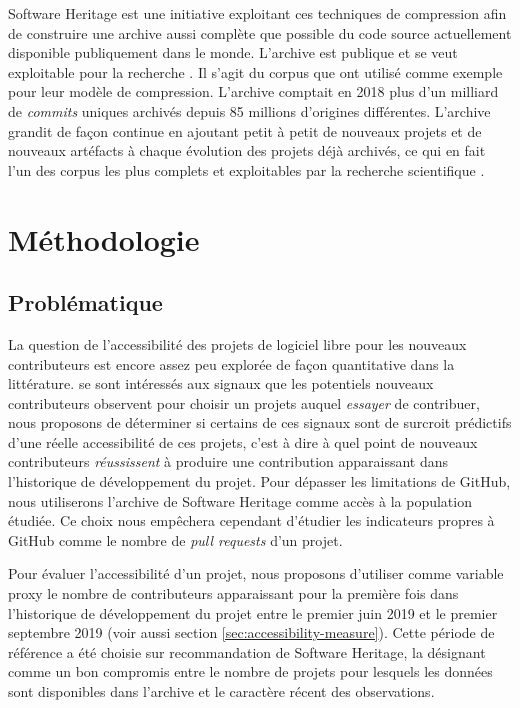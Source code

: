 \documentclass[dvipsnames,runningheads]{llncs}
\newcommand{\en}[1]{\foreignlanguage{english}{\emph{#1}}}
\begin{document}
    Software Heritage est une initiative exploitant ces techniques de compression afin de construire une
    archive aussi complète que possible du code source actuellement disponible publiquement dans le monde.
    L'archive est publique et se veut exploitable pour la recherche \parencite{swh-2017}. Il s'agit du corpus
    que \textcite{swh-graph-2020} ont utilisé comme exemple pour leur modèle de compression. L'archive
    comptait en 2018 plus d'un milliard de \en{commits} uniques archivés depuis 85 millions d'origines
    différentes. L'archive grandit de façon continue en ajoutant petit à petit de nouveaux projets et de
    nouveaux artéfacts à chaque évolution des projets déjà archivés, ce qui en fait l'un des corpus les plus
    complets et exploitables par la recherche scientifique \parencite{swh-2019,swh-growth-2019}.

    \section{Méthodologie}

    \subsection{Problématique}

    La question de l'accessibilité des projets de logiciel libre pour les nouveaux contributeurs est encore
    assez peu explorée de façon quantitative dans la littérature. \textcite{signals-2019} se sont intéressés
    aux signaux que les potentiels nouveaux contributeurs observent pour choisir un projets auquel
    \emph{essayer} de contribuer, nous proposons de déterminer si certains de ces signaux sont de surcroit
    prédictifs d'une réelle accessibilité de ces projets, c'est à dire à quel point de nouveaux contributeurs
    \emph{réussissent} à produire une contribution apparaissant dans l'historique de développement du projet.
    Pour dépasser les limitations de GitHub, nous utiliserons l'archive de Software Heritage comme accès à la
    population étudiée. Ce choix nous empêchera cependant d'étudier les indicateurs propres à GitHub comme le
    nombre de \en{pull requests} d'un projet.

    Pour évaluer l'accessibilité d'un projet, nous proposons d'utiliser comme variable proxy le nombre de
    contributeurs apparaissant pour la première fois dans l'historique de développement du projet entre le
    premier juin 2019 et le premier septembre 2019 \parencite{signals-2019} (voir aussi section
    \ref{sec:accessibility-measure}). Cette période de référence a été choisie sur recommandation
    de Software Heritage, la désignant comme un bon compromis entre le nombre de projets pour lesquels les
    données sont disponibles dans l'archive et le caractère récent des observations.
\end{document}
